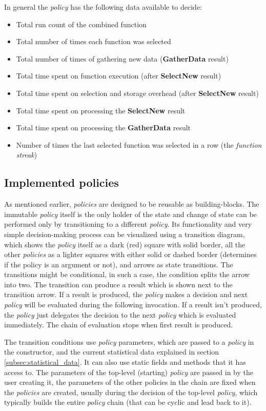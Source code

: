 In general the \textit{policy} has the following data available to decide:

\begin{itemize}
	\item Total run count of the combined function
	\item Total number of times each function was selected
	\item Total number of times of gathering new data (\textbf{GatherData} result)
	\item Total time spent on function execution (after \textbf{SelectNew} result)
	\item Total time spent on selection and storage overhead (after \textbf{SelectNew} result)
	\item Total time spent on processing the \textbf{SelectNew} result
	\item Total time spent on processing the \textbf{GatherData} result
	\item Number of times the last selected function was selected in a row (the \textit{function streak})
\end{itemize}

\subsection{Implemented policies}

As mentioned earlier, \textit{policies} are designed to be reusable as building-blocks. The immutable \textit{policy} itself is the only holder of the state and change of state can be performed only by transitioning to a different \textit{policy}. Its functionality and very simple decision-making process can be visualized using a transition diagram, which shows the \textit{policy} itself as a dark (red) square with solid border, all the other \textit{policies} as a lighter squares with either solid or dashed border (determines if the policy is an argument or not), and arrows as state transitions. The transitions might be conditional, in such a case, the condition splits the arrow into two. The transition can produce a result which is shown next to the transition arrow. If a result is produced, the \textit{policy} makes a decision and next \textit{policy} will be evaluated during the following invocation. If a result isn't produced, the \textit{policy} just delegates the decision to the next \textit{policy} which is evaluated immediately. The chain of evaluation stops when first result is produced.

The transition conditions use \textit{policy} parameters, which are passed to a \textit{policy} in the constructor, and the current statistical data explained in section \ref{subsec:statistical_data}. It can also use static fields and methods that it has access to. The parameters of the top-level (starting) \textit{policy} are passed in by the user creating it, the parameters of the other policies in the chain are fixed when the \textit{policies} are created, usually during the decision of the top-level \textit{policy}, which typically builds the entire \textit{policy} chain (that can be cyclic and lead back to it).

